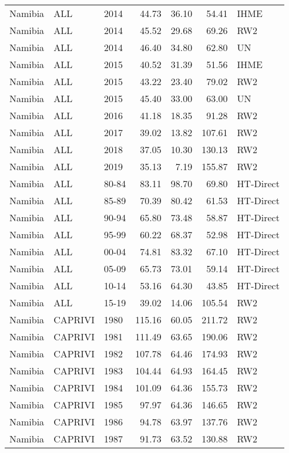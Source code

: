 \begin{longtable}{lllrrrl}
  Namibia & ALL & 2014 & 44.73 & 36.10 & 54.41 & IHME \\ 
  Namibia & ALL & 2014 & 45.52 & 29.68 & 69.26 & RW2 \\ 
  Namibia & ALL & 2014 & 46.40 & 34.80 & 62.80 & UN \\ 
  Namibia & ALL & 2015 & 40.52 & 31.39 & 51.56 & IHME \\ 
  Namibia & ALL & 2015 & 43.22 & 23.40 & 79.02 & RW2 \\ 
  Namibia & ALL & 2015 & 45.40 & 33.00 & 63.00 & UN \\ 
  Namibia & ALL & 2016 & 41.18 & 18.35 & 91.28 & RW2 \\ 
  Namibia & ALL & 2017 & 39.02 & 13.82 & 107.61 & RW2 \\ 
  Namibia & ALL & 2018 & 37.05 & 10.30 & 130.13 & RW2 \\ 
  Namibia & ALL & 2019 & 35.13 & 7.19 & 155.87 & RW2 \\ 
  Namibia & ALL & 80-84 & 83.11 & 98.70 & 69.80 & HT-Direct \\ 
  Namibia & ALL & 85-89 & 70.39 & 80.42 & 61.53 & HT-Direct \\ 
  Namibia & ALL & 90-94 & 65.80 & 73.48 & 58.87 & HT-Direct \\ 
  Namibia & ALL & 95-99 & 60.22 & 68.37 & 52.98 & HT-Direct \\ 
  Namibia & ALL & 00-04 & 74.81 & 83.32 & 67.10 & HT-Direct \\ 
  Namibia & ALL & 05-09 & 65.73 & 73.01 & 59.14 & HT-Direct \\ 
  Namibia & ALL & 10-14 & 53.16 & 64.30 & 43.85 & HT-Direct \\ 
  Namibia & ALL & 15-19 & 39.02 & 14.06 & 105.54 & RW2 \\ 
  Namibia & CAPRIVI & 1980 & 115.16 & 60.05 & 211.72 & RW2 \\ 
  Namibia & CAPRIVI & 1981 & 111.49 & 63.65 & 190.06 & RW2 \\ 
  Namibia & CAPRIVI & 1982 & 107.78 & 64.46 & 174.93 & RW2 \\ 
  Namibia & CAPRIVI & 1983 & 104.44 & 64.93 & 164.45 & RW2 \\ 
  Namibia & CAPRIVI & 1984 & 101.09 & 64.36 & 155.73 & RW2 \\ 
  Namibia & CAPRIVI & 1985 & 97.97 & 64.36 & 146.65 & RW2 \\ 
  Namibia & CAPRIVI & 1986 & 94.78 & 63.97 & 137.76 & RW2 \\ 
  Namibia & CAPRIVI & 1987 & 91.73 & 63.52 & 130.88 & RW2 \\ 

\end{longtable}
